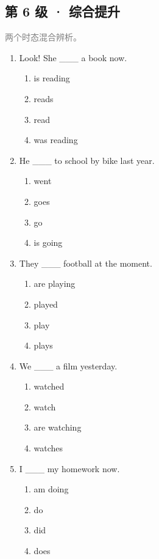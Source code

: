 \documentclass[11pt,a4paper]{ctexart}
\begin{document}
\subsection*{第 6 级 · 综合提升}
\noindent\textcolor{gray}{两个时态混合辨析。}\par\smallskip
\begin{enumerate}[leftmargin=*,itemsep=4pt]
\item Look! She \_\_\_ a book now.
\begin{enumerate}[label=\Alph*.,leftmargin=2em,itemsep=1pt,topsep=2pt]
\item is reading
\item reads
\item read
\item was reading
\end{enumerate}
\item He \_\_\_ to school by bike last year.
\begin{enumerate}[label=\Alph*.,leftmargin=2em,itemsep=1pt,topsep=2pt]
\item went
\item goes
\item go
\item is going
\end{enumerate}
\item They \_\_\_ football at the moment.
\begin{enumerate}[label=\Alph*.,leftmargin=2em,itemsep=1pt,topsep=2pt]
\item are playing
\item played
\item play
\item plays
\end{enumerate}
\item We \_\_\_ a film yesterday.
\begin{enumerate}[label=\Alph*.,leftmargin=2em,itemsep=1pt,topsep=2pt]
\item watched
\item watch
\item are watching
\item watches
\end{enumerate}
\item I \_\_\_ my homework now.
\begin{enumerate}[label=\Alph*.,leftmargin=2em,itemsep=1pt,topsep=2pt]
\item am doing
\item do
\item did
\item does

\end{enumerate}
\end{enumerate}
\end{document}
